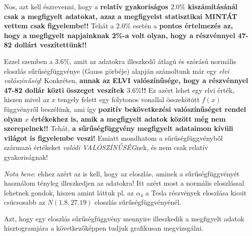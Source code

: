 \documentclass[
]{book}
\begin{document}
Nos, azt kell észrevenni, hogy a \textbf{relatív gyakoriságos \(2.0\%\) kiszámításánál csak a megfigyelt adatokat, azaz a megfigyelst statisztikai MINTÁT vettem csak figyelembe!!} Tehát a \(2.0\%\) esetén a \textbf{pontos értelmezés az, hogy a megfigyelt napjainknak 2\%-a volt olyan, hogy a részvénnyel 47-82 dollárt veszítettünk!!}

Ezzel szemben a \(3.6\%\), amit az adatokra illeszkedő átlagú és szórású normális eloszlás sűrűségfüggvénye (Gauss görbéje) alapján számoltunk már egy \emph{elvi valószínűség}! Konkréten, \textbf{annak az ELVI valószínűsége, hogy a részvénnyel 47-82 dollár közti összeget veszítek \(3.6\%\)!!} Ez azért lehet egy elvi érték, hiszen mivel az \(x\) tengely felett egy folytonos vonallal összekötött \(f(x)\) függvényről beszélünk, ami így \textbf{pozitív bekövetkezési valószínűséget rendel olyan \(x\) értékekhez is, amik a megfigyelt adatok között még nem szerepelnek!!} Tehát, \textbf{a sűrűségfüggvény megfigyelt adataimon kívüli világot is figyelembe veszi!} Emiatt mondhatom a sűrűségfüggvényből származó értékeket \emph{valódi VALÓSZÍNŰSÉG}nek, és nem csak relatív gyakoriságnak!

\emph{Nota bene}: ehhez azért az is kell, hogy az eloszlás, aminek a sűrűségfüggvényét használom tényleg illeszkedjen az adatokra! Itt azért most a normális eloszlással lehetnek gondok, hiszen amint láttuk pl. az \(\alpha_4\) a Tesla részvények eloszlása kicsit csúcsosabb az \(N(1.8,27.19)\) eloszlás sűrűségfüggvényénél.

Azt, hogy egy eloszlás sűrűségfüggvény mennyire illeszkedik a megfigyelt adatok hisztogramjára a következőképpen tudjuk grafikusan megvizsgálni.
\end{document}
